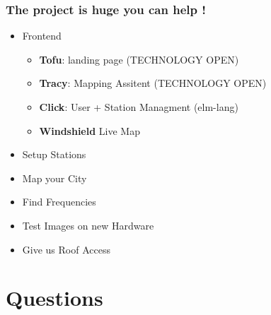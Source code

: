 \documentclass[aspectratio=169]{beamer}
\begin{document}
\begin{frame}
\frametitle{The project is huge you can help !}

\begin{itemize}
  \item Frontend
        \begin{itemize}
          \item \textbf{Tofu}: landing page (TECHNOLOGY OPEN)
          \item \textbf{Tracy}: Mapping Assitent (TECHNOLOGY OPEN)
          \item \textbf{Click}: User + Station Managment (elm-lang)
          \item \textbf{Windshield} Live Map
        \end{itemize}
  \item Setup Stations
  \item Map your City
  \item Find Frequencies
  \item Test Images on new Hardware
  \item Give us Roof Access
\end{itemize}

\end{frame}


\section{Questions}
\end{document}
